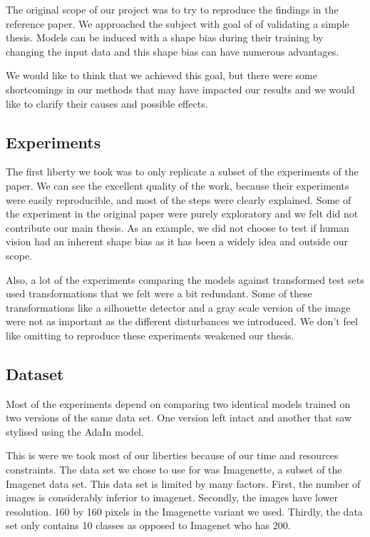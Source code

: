 \documentclass{article}
\begin{document}
The original scope of our project was to try to reproduce the findings in the reference paper.
We approached the subject with goal of of validating a simple thesis. 
Models can be induced with a shape bias during their training by changing the input data and 
this shape bias can have numerous advantages.\medskip \par

\noindent
We would like to think that we achieved this goal, but there were some shortcomings in our methods that may have impacted our results and we would like to clarify their causes and possible effects.

\subsection{Experiments}

The first liberty we took was to only replicate a subset of the experiments of the paper.
We can see the excellent quality of the work, 
because their experiments were easily reproducible, and most of the 
steps were clearly explained.
Some of the experiment in the original paper were purely exploratory and 
we felt did not contribute our main thesis. 
As an example, we did not choose to test if human vision had an inherent shape bias as 
it has been a widely idea and outside our scope. \medskip \par

\noindent
Also, a lot of the experiments comparing the models against transformed test sets used transformations that we felt were a bit redundant. Some of these transformations like a silhouette detector and a gray scale version of the image were not as important as the different disturbances we introduced.
We don't feel like omitting to reproduce these experiments weakened our thesis.

\subsection{Dataset}

Most of the experiments depend on comparing two identical models trained on two versions of the same data set. One version left intact and another that saw stylised using the AdaIn model. \medskip \par 

\noindent
This is were we took most of our liberties because of our time and resources constraints.
The data set we chose to use for was Imagenette, a subset of the Imagenet data set.
This data set is limited by many factors. First, the number of images is considerably inferior to imagenet. Secondly, the images have lower resolution. 160 by 160 pixels in the Imagenette variant we used. Thirdly, the data set only contains 10 classes as opposed to Imagenet who has 200. \medskip \par 
\end{document}
